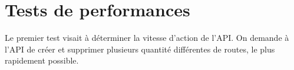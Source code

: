 




\newpage

\section{Tests de performances}

Le premier test visait à déterminer la vitesse d'action de l'API.\newline
On demande à l'API de créer et supprimer plusieurs quantité différentes de routes, le plus rapidement possible.\newline


